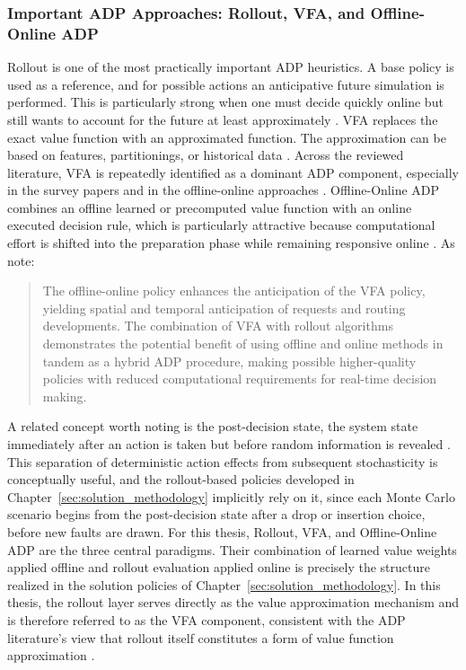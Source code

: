 \documentclass[12pt,oneside]{article}
\begin{document}
\subsubsection{Important ADP Approaches: Rollout, VFA, and Offline-Online ADP}
Rollout is one of the most practically important ADP heuristics. A base policy is used as a reference, and for possible actions an anticipative future simulation is performed. This is particularly strong when one must decide quickly online but still wants to account for the future at least approximately \citep{ulmer2019offline}.
VFA replaces the exact value function with an approximated function. The approximation can be based on features, partitionings, or historical data \citep{ulmer2020horizontal}. Across the reviewed literature, VFA is repeatedly identified as a dominant ADP component, especially in the survey papers and in the offline-online approaches \citep{mardevsic2023review}.
Offline-Online ADP combines an offline learned or precomputed value function with an online executed decision rule, which is particularly attractive because computational effort is shifted into the preparation phase while remaining responsive online \citep{ulmer2019offline}. As \citet[p.\,185]{ulmer2019offline} note: \begin{quote} The offline-online policy enhances the anticipation of the VFA policy, yielding spatial and temporal anticipation of requests and routing developments. The combination of VFA with rollout algorithms demonstrates the potential benefit of using offline and online methods in tandem as a hybrid ADP procedure, making possible higher-quality policies with reduced computational requirements for real-time decision making. \end{quote}
A related concept worth noting is the post-decision state, the system state immediately after an action is taken but before random information is revealed \citep{ulmer2017approximate}. This separation of deterministic action effects from subsequent stochasticity is conceptually useful, and the rollout-based policies developed in Chapter~\ref{sec:solution_methodology} implicitly rely on it, since each Monte Carlo scenario begins from the post-decision state after a drop or insertion choice, before new faults are drawn.
For this thesis, Rollout, VFA, and Offline-Online ADP are the three central paradigms. Their combination of learned value weights applied offline and rollout evaluation applied online is precisely the structure realized in the solution policies of Chapter~\ref{sec:solution_methodology}. In this thesis, the rollout layer serves directly as the value approximation mechanism and is therefore referred to as the VFA component, consistent with the ADP literature's view that rollout itself constitutes a form of value function approximation \citep{ulmer2017approximate}.
\end{document}

